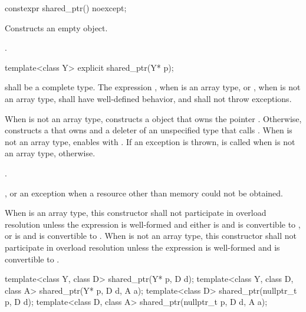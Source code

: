 %
\begin{itemdecl}
constexpr shared_ptr() noexcept;
\end{itemdecl}

\begin{itemdescr}
\pnum
\effects
Constructs an empty  object.

\pnum
\ensures
{}.
\end{itemdescr}

%
\begin{itemdecl}
template<class Y> explicit shared_ptr(Y* p);
\end{itemdecl}

\begin{itemdescr}
\pnum
\requires {} shall be a complete type. The expression
, when  is an array type, or
, when  is not an array type,
shall have well-defined behavior, and
shall not throw exceptions.

\pnum
\effects
When  is not an array type,
constructs a  object
that owns the pointer .
Otherwise, constructs a 
that owns  and a deleter of an
unspecified type that calls .
When  is not an array type,
enables  with .
If an exception is thrown,  is called
when  is not an array type,  otherwise.

\pnum
\ensures
{}.

\pnum
\throws
{}, or an  exception when a resource other than memory could not be obtained.

\pnum
\remarks
When  is an array type,
this constructor shall not participate in overload resolution unless
the expression  is well-formed and either
 is  and  is convertible to , or
 is  and  is convertible to .
When  is not an array type,
this constructor shall not participate in overload resolution unless
the expression  is well-formed and
 is convertible to .
\end{itemdescr}

%
\begin{itemdecl}
template<class Y, class D> shared_ptr(Y* p, D d);
template<class Y, class D, class A> shared_ptr(Y* p, D d, A a);
template<class D> shared_ptr(nullptr_t p, D d);
template<class D, class A> shared_ptr(nullptr_t p, D d, A a);
\end{itemdecl}


